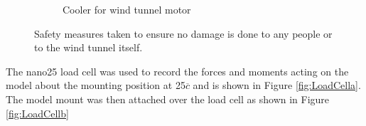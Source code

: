 \begin{figure}[H]
\begin{subfigure}[b]{0.45\textwidth}
                \caption{Cooler for wind tunnel motor}
                \label{fig:engineCooler}
     \end{subfigure}
     \caption{Safety measures taken to ensure no damage is done to any people or to the wind tunnel itself.}
     \label{fig:windTunnelSafety}
\end{figure}


The nano25 load cell was used to record the forces and moments acting on the model about the mounting position at 25$\overline{c}$ and is shown in Figure \ref{fig:LoadCella}. The model mount was then attached over the load cell as shown in Figure \ref{fig:LoadCellb}

